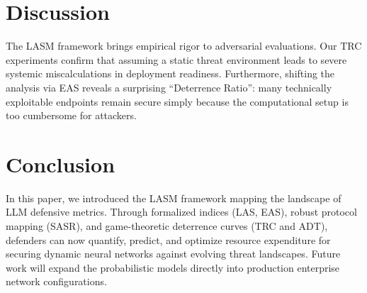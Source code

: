 \section{Discussion}
\label{sec:discussion}

The LASM framework brings empirical rigor to adversarial evaluations. Our TRC experiments confirm that assuming a static threat environment leads to severe systemic miscalculations in deployment readiness. Furthermore, shifting the analysis via EAS reveals a surprising ``Deterrence Ratio'': many technically exploitable endpoints remain secure simply because the computational setup is too cumbersome for attackers.

\section{Conclusion}
\label{sec:conclusion}

In this paper, we introduced the LASM framework mapping the landscape of LLM defensive metrics. Through formalized indices (LAS, EAS), robust protocol mapping (SASR), and game-theoretic deterrence curves (TRC and ADT), defenders can now quantify, predict, and optimize resource expenditure for securing dynamic neural networks against evolving threat landscapes. Future work will expand the probabilistic models directly into production enterprise network configurations.
